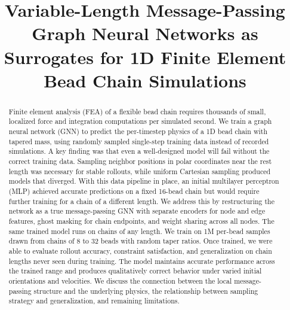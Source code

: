 \documentclass[conference]{IEEEtran}
\begin{document}
\title{Variable-Length Message-Passing Graph Neural Networks as Surrogates for 1D Finite Element Bead Chain Simulations}

\author{
\and
{}
}

\maketitle

\begin{abstract}
Finite element analysis (FEA) of a flexible bead chain requires thousands of small, localized force and integration computations per simulated second. We train a graph neural network (GNN) to predict the per-timestep physics of a 1D bead chain with tapered mass, using randomly sampled single-step training data instead of recorded simulations. A key finding was that even a well-designed model will fail without the correct training data. Sampling neighbor positions in polar coordinates near the rest length was necessary for stable rollouts, while uniform Cartesian sampling produced models that diverged. With this data pipeline in place, an initial multilayer perceptron (MLP) achieved accurate predictions on a fixed 16-bead chain but would require further training for a chain of a different length. We address this by restructuring the network as a true message-passing GNN with separate encoders for node and edge features, ghost masking for chain endpoints, and weight sharing across all nodes. The same trained model runs on chains of any length. We train on 1M per-bead samples drawn from chains of 8 to 32 beads with random taper ratios. Once trained, we were able to evaluate rollout accuracy, constraint satisfaction, and generalization on chain lengths never seen during training. The model maintains accurate performance across the trained range and produces qualitatively correct behavior under varied initial orientations and velocities. We discuss the connection between the local message-passing structure and the underlying physics, the relationship between sampling strategy and generalization, and remaining limitations.
\end{abstract}
\end{document}
